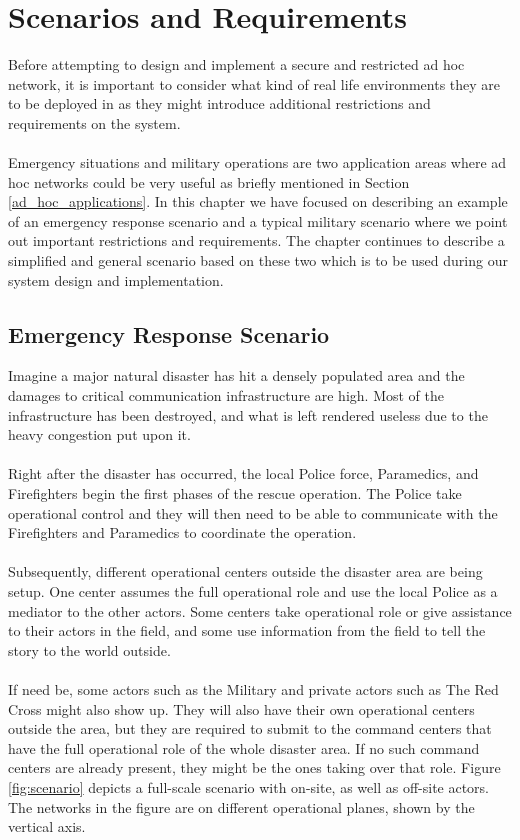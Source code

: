 \chapter{Scenarios and Requirements}
\label{scenario_requirements}
Before attempting to design and implement a secure and restricted ad hoc network, it is important to consider what kind of real life environments they are to be deployed in as they might introduce additional restrictions and requirements on the system. 
\\\\
Emergency situations and military operations are two application areas where ad hoc networks could be very useful as briefly mentioned in Section \ref{ad_hoc_applications}. In this chapter we have focused on describing an example of an emergency response scenario and a typical military scenario where we point out important restrictions and requirements. The chapter continues to describe a simplified and general scenario based on these two which is to be used during our system design and implementation.

\section{Emergency Response Scenario}\label{ems_scen}
Imagine a major natural disaster has hit a densely populated area and the damages to critical communication infrastructure are high. Most of the infrastructure has been destroyed, and what is left rendered useless due to the heavy congestion put upon it. 
\\\\
Right after the disaster has occurred, the local Police force, Paramedics, and Firefighters begin the first phases of the rescue operation. The Police take operational control and they will then need to be able to communicate with the Firefighters and Paramedics to coordinate the operation.
\\\\
Subsequently, different operational centers outside the disaster area are being setup. One center assumes the full operational role and use the local Police as a mediator to the other actors. Some centers take operational role or give assistance to their actors in the field, and some use information from the field to tell the story to the world outside.
\\\\
If need be, some actors such as the Military and private actors such as The Red Cross might also show up. They will also have their own operational centers outside the area, but they are required to submit to the command centers that have the full operational role of the whole disaster area. If no such command centers are already present, they might be the ones taking over that role. Figure \ref{fig:scenario} depicts a full-scale scenario with on-site, as well as off-site actors. The networks in the figure are on different operational planes, shown by the vertical axis.

